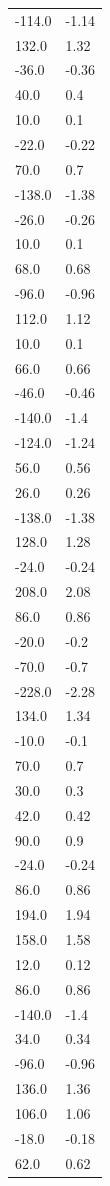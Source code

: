\begin{longtable}{ll}
-114.0 & -1.14 \\
132.0 & 1.32 \\
-36.0 & -0.36 \\
40.0 & 0.4 \\
10.0 & 0.1 \\
-22.0 & -0.22 \\
70.0 & 0.7 \\
-138.0 & -1.38 \\
-26.0 & -0.26 \\
10.0 & 0.1 \\
68.0 & 0.68 \\
-96.0 & -0.96 \\
112.0 & 1.12 \\
10.0 & 0.1 \\
66.0 & 0.66 \\
-46.0 & -0.46 \\
-140.0 & -1.4 \\
-124.0 & -1.24 \\
56.0 & 0.56 \\
26.0 & 0.26 \\
-138.0 & -1.38 \\
128.0 & 1.28 \\
-24.0 & -0.24 \\
208.0 & 2.08 \\
86.0 & 0.86 \\
-20.0 & -0.2 \\
-70.0 & -0.7 \\
-228.0 & -2.28 \\
134.0 & 1.34 \\
-10.0 & -0.1 \\
70.0 & 0.7 \\
30.0 & 0.3 \\
42.0 & 0.42 \\
90.0 & 0.9 \\
-24.0 & -0.24 \\
86.0 & 0.86 \\
194.0 & 1.94 \\
158.0 & 1.58 \\
12.0 & 0.12 \\
86.0 & 0.86 \\
-140.0 & -1.4 \\
34.0 & 0.34 \\
-96.0 & -0.96 \\
136.0 & 1.36 \\
106.0 & 1.06 \\
-18.0 & -0.18 \\
62.0 & 0.62 \\

\end{longtable}
